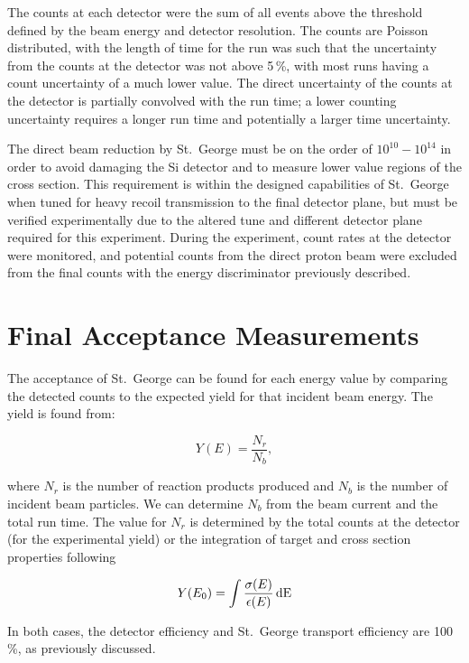 The counts at each detector were the sum of all events above the
threshold defined by the beam energy and detector resolution. The counts
are Poisson distributed, with the length of time for the run was such
that the uncertainty from the counts at the detector was not above
5\,\%, with most runs having a count uncertainty of a much lower value.
The direct uncertainty of the counts at the detector is partially
convolved with the run time; a lower counting uncertainty requires a
longer run time and potentially a larger time uncertainty.

The direct beam reduction by St.\ George must be on the order of
$10^{10}-10^{14}$ in order to avoid damaging the Si detector and to
measure lower value regions of the cross section. This requirement is
within the designed capabilities of St.\ George when tuned for heavy
recoil transmission to the final detector plane, but must be verified
experimentally due to the altered tune and different detector plane
required for this experiment. During the experiment, count rates at the
detector were monitored, and potential counts from the direct proton
beam were excluded from the final counts with the energy discriminator
previously described.

\section{Final Acceptance Measurements}
\label{sec:final-acceptance-measurements}

The acceptance of St.\ George can be found for each energy value by
comparing the detected counts to the expected yield for that incident
beam energy. The yield is found from:

\begin{equation}
    Y(E) = \frac{N_r}{N_b},
\end{equation}

where $N_r$ is the number of reaction products produced and $N_b$ is the
number of incident beam particles. We can determine $N_b$ from the beam
current and the total run time. The value for $N_r$ is determined by the
total counts at the detector (for the experimental yield) or the
integration of target and cross section properties following

\begin{equation}
    Y(E_0) = \int \frac{\sigma(E)}{\epsilon(E)}\,\rm{d}E
\end{equation}

In both cases, the detector efficiency and St.\ George transport
efficiency are 100\,\%, as previously discussed.


